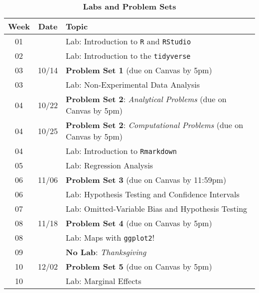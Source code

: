 \documentclass[10pt]{article}
\newcommand{\ra}[1]{\renewcommand{\arraystretch}{#1}}
\begin{document}
\newpage

\begin{table}[h!]
	\caption*{\large\textbf{Labs and Problem Sets}}
	\centering
	\ra{1.5}
	\begin{tabular}{@{\extracolsep{0.5cm}} c c l @{}}
		\toprule
		\textbf{Week} & \textbf{Date} & \textbf{Topic}  \\ \toprule
		01 &  & Lab: Introduction to \texttt{R} and \texttt{RStudio} \\
		02 &  & Lab: Introduction to the \texttt{tidyverse} \\ 
		03 & 10/14 & \textbf{Problem Set 1} (due on Canvas by 5pm)  \\ \midrule
		03 &  & Lab: Non-Experimental Data Analysis \\ 
		04 & 10/22 & \textbf{Problem Set 2}: \textit{Analytical Problems} (due on Canvas by 5pm) \\
		04 & 10/25 & \textbf{Problem Set 2}: \textit{Computational Problems} (due on Canvas by 5pm)  \\ \midrule
		04 &  & Lab: Introduction to \texttt{Rmarkdown} \\ 
		05 &  & Lab: Regression Analysis \\ 
		06 & 11/06 & \textbf{Problem Set 3} (due on Canvas by 11:59pm) \\ \midrule
		06 &  & Lab: Hypothesis Testing and Confidence Intervals \\
		07 &  & Lab: Omitted-Variable Bias and Hypothesis Testing \\ 
		08 & 11/18 & \textbf{Problem Set 4} (due on Canvas by 5pm)  \\ \midrule
		08 &  & Lab: Maps with \texttt{ggplot2}! \\
		09 &  & \textbf{No Lab}: \textit{Thanksgiving} \\ 
		10 & 12/02 & \textbf{Problem Set 5} (due on Canvas by 5pm) \\ \midrule
		10 &  & Lab: Marginal Effects \\ \bottomrule
	\end{tabular}
\end{table}
\end{document}
